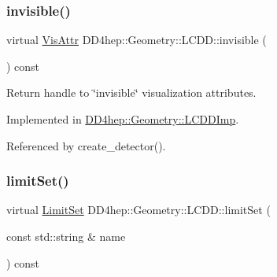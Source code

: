 \hypertarget{class_d_d4hep_1_1_geometry_1_1_l_c_d_d_acafee280cadae2b44117eb751e0790aa}{}\label{class_d_d4hep_1_1_geometry_1_1_l_c_d_d_acafee280cadae2b44117eb751e0790aa} 
\subsubsection{\texorpdfstring{invisible()}{invisible()}}
{\footnotesize\ttfamily virtual \hyperlink{class_d_d4hep_1_1_geometry_1_1_vis_attr}{Vis\+Attr} D\+D4hep\+::\+Geometry\+::\+L\+C\+D\+D\+::invisible (\begin{DoxyParamCaption}{ }\end{DoxyParamCaption}) const\hspace{0.3cm}{\ttfamily [pure virtual]}}



Return handle to \char`\"{}invisible\char`\"{} visualization attributes. 



Implemented in \hyperlink{class_d_d4hep_1_1_geometry_1_1_l_c_d_d_imp_ab91d4678b7c2650d13859dc6e1cb0a3f}{D\+D4hep\+::\+Geometry\+::\+L\+C\+D\+D\+Imp}.



Referenced by create\+\_\+detector().

\hypertarget{class_d_d4hep_1_1_geometry_1_1_l_c_d_d_a7e98996675e9c00d6b64010415511813}{}\label{class_d_d4hep_1_1_geometry_1_1_l_c_d_d_a7e98996675e9c00d6b64010415511813} 
\subsubsection{\texorpdfstring{limit\+Set()}{limitSet()}}
{\footnotesize\ttfamily virtual \hyperlink{class_d_d4hep_1_1_geometry_1_1_limit_set}{Limit\+Set} D\+D4hep\+::\+Geometry\+::\+L\+C\+D\+D\+::limit\+Set (\begin{DoxyParamCaption}\item[{const std\+::string \&}]{name }\end{DoxyParamCaption}) const\hspace{0.3cm}{\ttfamily [pure virtual]}}



